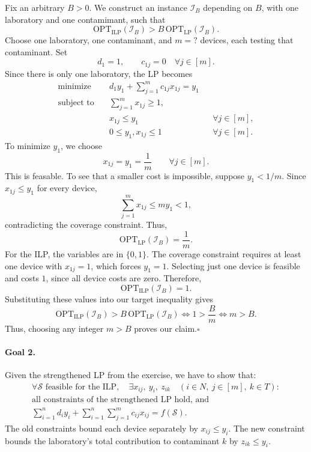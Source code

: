 \documentclass[12pt,a4paper]{article}
\begin{document}
Fix an arbitrary $B>0$. We construct an instance $\mathcal{I}_B$
depending on $B$, with one laboratory and one contamimant, such that
\[
\mathrm{OPT}_{\mathrm{ILP}}(\mathcal{I}_B)
>B\,\mathrm{OPT}_{\mathrm{LP}}(\mathcal{I}_B).
\]
Choose one laboratory, one contaminant, and $m=?$
devices, each testing that contaminant. Set
\[
d_1=1,\qquad c_{1j}=0\quad\forall j\in[m].
\]
Since there is only one laboratory, the LP becomes
\[
\begin{aligned}
\text{minimize}\quad &d_1y_1+\sum_{j=1}^m c_{1j}x_{1j}=y_1\\
\text{subject to}\quad &\sum_{j=1}^m x_{1j}\geq1,\\
&x_{1j}\leq y_1 &&\forall j\in[m],\\
&0\leq y_1,x_{1j}\leq1 &&\forall j\in[m].
\end{aligned}
\]
To minimize $y_1$, we choose
\[
x_{1j}=y_1=\frac1m\qquad\forall j\in[m].
\]
This is feasable. To see that a smaller cost is impossible, suppose
$y_1<1/m$. Since $x_{1j}\leq y_1$ for every device,
\[
\sum_{j=1}^m x_{1j}\leq my_1<1,
\]
contradicting the coverage constraint. Thus,
\[
\mathrm{OPT}_{\mathrm{LP}}(\mathcal{I}_B)=\frac1m.
\]
For the ILP, the variables are in $\{0,1\}$. The coverage constraint
requires at least one device with $x_{1j}=1$, which forces $y_1=1$.
Selecting just one device is feasible and costs $1$, since all device
costs are zero. Therefore,
\[
\mathrm{OPT}_{\mathrm{ILP}}(\mathcal{I}_B)=1.
\]
Substituting these values into our target inequality gives
\[
\mathrm{OPT}_{\mathrm{ILP}}(\mathcal{I}_B)
>B\,\mathrm{OPT}_{\mathrm{LP}}(\mathcal{I}_B)
\iff 1>\frac Bm
\iff m>B.
\]
Thus, choosing any integer $m>B$ proves our claim.\hfill$\square$

\paragraph{Goal 2.}
Given the strengthened LP from the exercise, we have to show that:
\[
\begin{gathered}
\forall\mathcal{S}\text{ feasible for the ILP},\quad
\exists x_{ij},\ y_i,\ z_{ik}\quad(i\in N,\ j\in[m],\ k\in T):\\
\text{all constraints of the strengthened LP hold, and}\\
\sum_{i=1}^n d_i y_i
+\sum_{i=1}^n\sum_{j=1}^m c_{ij}x_{ij}=f(\mathcal{S}).
\end{gathered}
\]
The old constraints bound each device separately by $x_{ij}\leq y_i$.
The new constraint bounds the laboratory's total contribution to contaminant $k$ by
$z_{ik}\leq y_i$.
\end{document}
